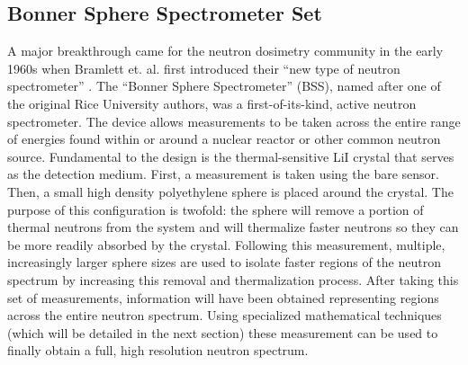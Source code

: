 \subsection{Bonner Sphere Spectrometer Set}
A major breakthrough came for the neutron dosimetry community in the early 1960s when Bramlett et. al. first introduced their ``new type of neutron spectrometer'' \cite{bramblett1960new}.
The ``Bonner Sphere Spectrometer'' (BSS), named after one of the original Rice University authors, was a first-of-its-kind, active neutron spectrometer.
The device allows measurements to be taken across the entire range of energies found within or around a nuclear reactor or other common neutron source.
Fundamental to the design is the thermal-sensitive LiI crystal that serves as the detection medium.
First, a measurement is taken using the bare sensor.
Then, a small high density polyethylene sphere is placed around the crystal.
The purpose of this configuration is twofold: the sphere will remove a portion of thermal neutrons from the system and will thermalize faster neutrons so they can be more readily absorbed by the crystal.
Following this measurement, multiple, increasingly larger sphere sizes are used to isolate faster regions of the neutron spectrum by increasing this removal and thermalization process.
After taking this set of measurements, information will have been obtained representing regions across the entire neutron spectrum.
Using specialized mathematical techniques (which will be detailed in the next section) these measurement can be used to finally obtain a full, high resolution neutron spectrum.

